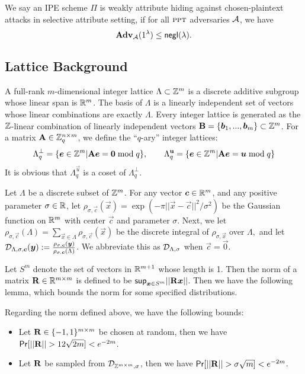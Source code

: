 \begin{definition}\label{defn:sec}
We say an IPE scheme $\Pi$ is weakly attribute hiding against chosen-plaintext attacks in selective attribute setting, if for all $\textsc{ppt}$ adversaries $\mathcal{A}$, we have
$$\mathbf{Adv}_{\mathcal{A}}(1^\lambda) \leq \mathsf{negl}(\lambda).$$
\end{definition}


\subsection{Lattice Background}
A full-rank $m$-dimensional integer lattice $\Lambda\subset\mathbb{Z}^m$ is a discrete additive subgroup whose linear span is $\mathbb{R}^m$. The basis of $\Lambda$ is a linearly independent set of vectors whose linear combinations are exactly $\Lambda$. Every integer lattice is generated as the $\mathbb{Z}$-linear combination of linearly independent vectors $\mathbf{B}=\{\boldsymbol{b}_1,...,\boldsymbol{b}_m\}\subset\mathbb{Z}^m$. For a matrix $\mathbf{A}\in\mathbb{Z}^{n\times m}_q$, we define the ``$q$-ary'' integer lattices:
$$\Lambda_q^{\bot}=\{\boldsymbol{e} \in \mathbb{Z}^m| \mathbf{A} \boldsymbol{e} = \boldsymbol{0} \bmod q\},\qquad  \Lambda_q^{\mathbf{u}}=\{\boldsymbol{e}\in\mathbb{Z}^m|\mathbf{A}\boldsymbol{e} = \boldsymbol{u} \bmod q\}$$
It is obvious that $\Lambda_q^{\vec{u}}$ is a coset of $\Lambda_q^{\bot}$.

Let $\Lambda$ be a discrete subset of $\mathbb{Z}^m$. For any vector $\boldsymbol{c}\in\mathbb{R}^m$, and any positive parameter $\sigma\in\mathbb{R}$, let $\rho_{\sigma, \vec{c}}(\vec{x})=\exp(-\pi||\vec{x}-\vec{c}||^2 / \sigma^2)$ be the Gaussian function on $\mathbb{R}^m$ with center $\vec{c}$ and parameter $\sigma$. Next, we let $\rho_{\sigma, \vec{c}}(\Lambda)=\sum_{\vec{x}\in\Lambda}\rho_{\sigma, \vec{c}}(\vec{x})$ be the discrete integral of $\rho_{\sigma, \vec{x}}$ over $\Lambda,$ and let $\mathcal{D}_{\Lambda, \sigma, \boldsymbol{c}}(\boldsymbol{y}):=\frac{\rho_{\sigma, \boldsymbol{c}}(\boldsymbol{y})}{\rho_{\sigma, \boldsymbol{c}}(\Lambda)}$. We abbreviate this as $\mathcal{D}_{\Lambda, \sigma}$ when $\vec{c}=\vec{0}.$

Let $S^m$ denote the set of vectors in $\mathbb{R}^{m + 1}$ whose length is 1. Then the norm of a matrix $\mathbf{R} \in \mathbb{R}^{m \times m}$ is defined to be $\mathsf{sup}_{\boldsymbol{x} \in S^m} ||\mathbf{R} \boldsymbol{x}||$. Then we have the following lemma, which bounds the norm for some specified distributions.

\begin{lemma}\label{lem:bound}
Regarding the norm defined above, we have the following bounds:
\begin{itemize}
 \item Let $\mathbf{R} \in \{-1, 1\}^{m \times m}$ be chosen at random, then we have $\mathsf{Pr}[||\mathbf{R}|| > 12 \sqrt{2m}] < e^{-2m}$.
 \item Let $\mathbf{R}$ be sampled from $\mathcal{D}_{\mathbb{Z}^{m \times m}, \sigma}$, then we have $\mathsf{Pr} [||\mathbf{R}|| > \sigma \sqrt{m}] < e^{-2m}$.
\end{itemize}
\end{lemma}


